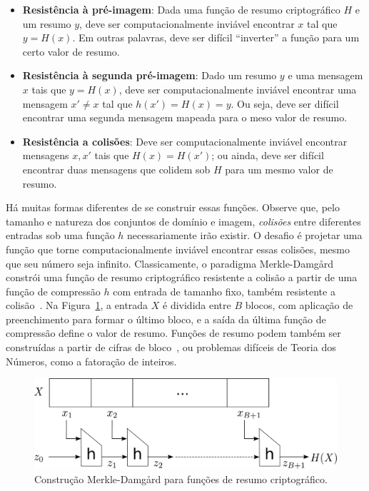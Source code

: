 \begin{itemize}
 \item {\bf Resistência à pré-imagem}: Dada uma função de resumo criptográfico $H$ e um resumo $y$, deve ser computacionalmente inviável encontrar $x$ tal que $y = H(x)$. Em outras palavras, deve ser difícil ``inverter'' a função para um certo valor de resumo.
 \item {\bf Resistência à segunda pré-imagem}: Dado um resumo $y$ e uma mensagem $x$ tais que $y = H(x)$, deve ser computacionalmente inviável encontrar uma mensagem $x' \neq x$ tal que $h(x') = H(x) = y$. Ou seja, deve ser difícil encontrar uma segunda mensagem mapeada para o meso valor de resumo.
 \item {\bf Resistência a colisões}: Deve ser computacionalmente inviável encontrar mensagens $x, x'$ tais que $H(x) = H(x')$; ou ainda, deve ser difícil encontrar duas mensagens que colidem sob $H$ para um mesmo valor de resumo.
\end{itemize}

Há muitas formas diferentes de se construir essas funções.
Observe que, pelo tamanho e natureza dos conjuntos de domínio e imagem, \emph{colisões} entre diferentes entradas sob uma função $h$ necessariamente irão existir. O desafio é projetar uma função que torne computacionalmente inviável encontrar essas colisões, mesmo que seu número seja infinito.
Classicamente, o paradigma Merkle-Damg\aa rd constrói uma função de resumo criptográfico resistente a colisão a partir de uma função de compressão $h$ com entrada de tamanho fixo, também resistente a colisão~\cite{Merkle79,Damgard89a}. Na Figura~\ref{fig:merkle}, a entrada $X$ é dividida entre $B$ blocos, com aplicação de preenchimento para formar o último bloco, e a saída da última função de compressão define o valor de resumo. Funções de resumo podem também ser construídas a partir de cifras de bloco~\cite{PreneelGV93}, ou problemas difíceis de Teoria dos Números, como a fatoração de inteiros.

\begin{figure}[htbp]
\begin{center}
    \includegraphics[scale=0.2]{figures/merkle.pdf}
    \caption{Construção Merkle-Damg\aa rd para funções de resumo criptográfico.}
    \label{fig:merkle}
\end{center}
\end{figure}

